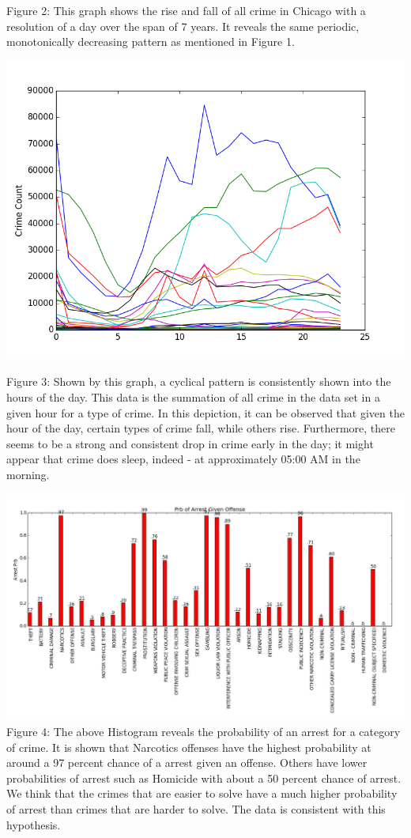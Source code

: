 \documentclass[journal]{IEEEtran}
\begin{document}
Figure 2:
This graph shows the rise and fall of all crime in Chicago with a resolution of a day over the span of 7 years. It reveals the same periodic, monotonically decreasing pattern as mentioned in Figure 1. 

\includegraphics[scale = 0.4]{Crime/Hour.png}

Figure 3:
Shown by this graph, a cyclical pattern is consistently shown into the hours of the day. This data is the summation of all crime in the data set in a given hour for a type of crime. In this depiction, it can be observed that given the hour of the day, certain types of crime fall, while others rise. 
Furthermore, there seems to be a strong and consistent drop in crime early in the day; it might appear that crime does sleep, indeed - at approximately 05:00 AM in the morning.

\includegraphics[scale = 0.15]{arrest1.jpg}
Figure 4:
The above Histogram reveals the probability of an arrest for a category of crime. 
It is shown that Narcotics offenses have the highest probability at around a 97 percent chance of a arrest given an offense. Others have lower probabilities of arrest such as Homicide with about a 50 percent chance of arrest. We think that the crimes that are easier to solve have a much higher probability of arrest than crimes that are harder to solve. The data is consistent with this hypothesis. 
\end{document}
